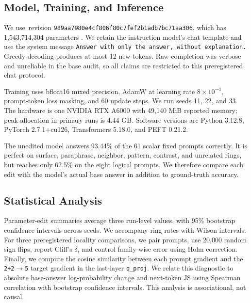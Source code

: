 \subsection{Model, Training, and Inference}

We use \,\qwen revision \texttt{989aa7980e4cf806f80c7fef2b1adb7bc71aa306}, which has 1,543,714,304 parameters \cite{qwen2025technical}. We retain the instruction model's chat template and use the system message \texttt{Answer with only the answer, without explanation.} Greedy decoding produces at most 12 new tokens. Raw completion was verbose and unreliable in the base audit, so all claims are restricted to this preregistered chat protocol.

Training uses bfloat16 mixed precision, AdamW at learning rate $8\times10^{-4}$, prompt-token loss masking, and 60 update steps. We run seeds 11, 22, and 33. The hardware is one NVIDIA RTX A6000 with 49,140 MiB reported memory; peak allocation in primary runs is 4.44 GB. Software versions are Python 3.12.8, PyTorch 2.7.1+cu126, Transformers 5.18.0, and PEFT 0.21.2.

The unedited model answers 93.44\% of the 61 scalar fixed prompts correctly. It is perfect on surface, paraphrase, neighbor, pattern, contrast, and unrelated rings, but reaches only 62.5\% on the eight logical prompts. We therefore compare each edit with the model's actual base answer in addition to ground-truth accuracy.

\subsection{Statistical Analysis}

Parameter-edit summaries average three run-level values, with 95\% bootstrap confidence intervals across seeds. We accompany ring rates with Wilson intervals. For three preregistered locality comparisons, we pair prompts, use 20,000 random sign flips, report Cliff's $\delta$, and control family-wise error using Holm correction. Finally, we compute the cosine similarity between each prompt gradient and the \texttt{2+2}$\rightarrow$\texttt{5} target gradient in the last-layer \texttt{q\_proj}. We relate this diagnostic to absolute base-answer log-probability change and next-token JS using Spearman correlation with bootstrap confidence intervals. This analysis is associational, not causal.
